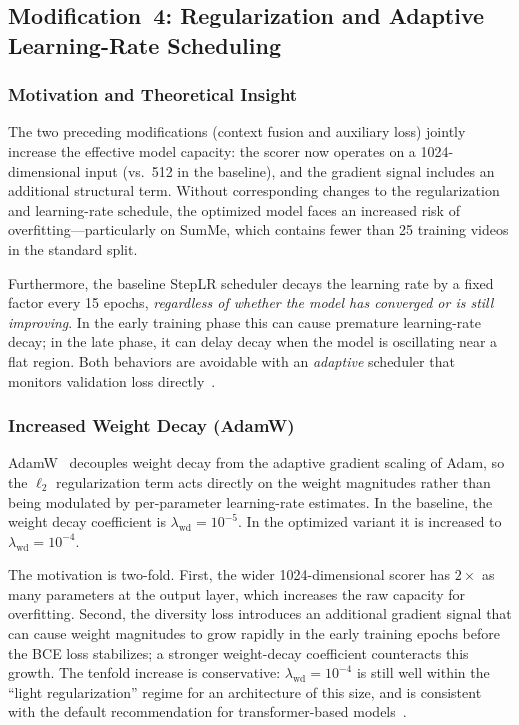 \documentclass[10pt,conference]{IEEEtran}
\begin{document}
\subsection{Modification~4: Regularization and Adaptive Learning-Rate Scheduling}

\subsubsection{Motivation and Theoretical Insight}

The two preceding modifications (context fusion and auxiliary loss) jointly
increase the effective model capacity: the scorer now operates on a
1024-dimensional input (vs.\ 512 in the baseline), and the gradient signal
includes an additional structural term. Without corresponding changes to the
regularization and learning-rate schedule, the optimized model faces an
increased risk of overfitting---particularly on SumMe, which contains fewer
than 25 training videos in the standard split.

Furthermore, the baseline StepLR scheduler decays the learning rate by a
fixed factor every 15 epochs, \emph{regardless of whether the model has
converged or is still improving}. In the early training phase this can cause
premature learning-rate decay; in the late phase, it can delay decay when
the model is oscillating near a flat region. Both behaviors are avoidable
with an \emph{adaptive} scheduler that monitors validation loss
directly~\cite{pytorch_reducelr}.

\subsubsection{Increased Weight Decay (AdamW)}

AdamW~\cite{loshchilov2019} decouples weight decay from the adaptive
gradient scaling of Adam, so the $\ell_2$ regularization term acts directly
on the weight magnitudes rather than being modulated by per-parameter
learning-rate estimates. In the baseline, the weight decay coefficient is
$\lambda_{\mathrm{wd}} = 10^{-5}$. In the optimized variant it is increased
to $\lambda_{\mathrm{wd}} = 10^{-4}$.

The motivation is two-fold. First, the wider 1024-dimensional scorer has
$2\times$ as many parameters at the output layer, which increases the raw
capacity for overfitting. Second, the diversity loss introduces an additional
gradient signal that can cause weight magnitudes to grow rapidly in the
early training epochs before the BCE loss stabilizes; a stronger weight-decay
coefficient counteracts this growth. The tenfold increase is conservative:
$\lambda_{\mathrm{wd}} = 10^{-4}$ is still well within the
``light regularization'' regime for an architecture of this size, and is
consistent with the default recommendation for transformer-based
models~\cite{goodfellow2016}.
\end{document}
